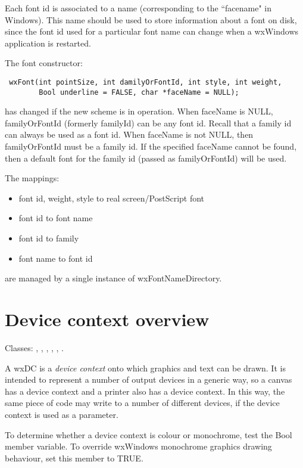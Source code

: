 Each font id is associated to a name (corresponding to the ``facename"
in Windows). This name should be used to store information about a
font on disk, since the font id used for a particular font name can
change when a wxWindows application is restarted.

The font constructor:

\begin{verbatim}
 wxFont(int pointSize, int damilyOrFontId, int style, int weight, 
        Bool underline = FALSE, char *faceName = NULL);
\end{verbatim}

has changed if the new scheme is in operation. When faceName is NULL,
familyOrFontId (formerly familyId) can be any font id. Recall that a
family id can always be used as a font id. When faceName is not NULL,
then familyOrFontId must be a family id. If the specified faceName
cannot be found, then a default font for the family id (passed as
familyOrFontId) will be used. 

The mappings:

\begin{itemize}\itemsep=0pt
\item font id, weight, style to real screen/PostScript font
\item font id to font name
\item font id to family
\item font name to font id
\end{itemize}

are managed by a single instance of wxFontNameDirectory.


\section{Device context overview}\label{dcoverview}

Classes: , ,\rtfsp
\rtfsp{}, , ,\rtfsp
{}.

A wxDC is a {\it device context} onto which graphics and text can be drawn.
It is intended to represent a number of output devices in a generic way,
so a canvas has a device context and a printer also has a device context.
In this way, the same piece of code may write to a number of different devices,
if the device context is used as a parameter.

To determine whether a device context is colour or monochrome, test the
 Bool member variable. To override wxWindows monochrome
graphics drawing behaviour, set this member to TRUE.

